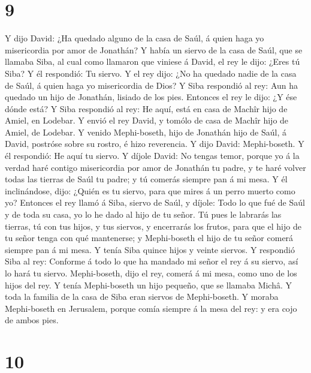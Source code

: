 \hypertarget{section-8}{%
\section{9}\label{section-8}}

 Y dijo David: ¿Ha quedado alguno de la casa de Saúl, á
quien haga yo misericordia por amor de Jonathán?  Y había un
siervo de la casa de Saúl, que se llamaba Siba, al cual como llamaron
que viniese á David, el rey le dijo: ¿Eres tú Siba? Y él respondió: Tu
siervo.  Y el rey dijo: ¿No ha quedado nadie de la casa de
Saúl, á quien haga yo misericordia de Dios? Y Siba respondió al rey: Aun
ha quedado un hijo de Jonathán, lisiado de los pies. 
Entonces el rey le dijo: ¿Y ése dónde está? Y Siba respondió al rey: He
aquí, está en casa de Machîr hijo de Amiel, en Lodebar.  Y
envió el rey David, y tomólo de casa de Machîr hijo de Amiel, de
Lodebar.  Y venido Mephi-boseth, hijo de Jonathán hijo de
Saúl, á David, postróse sobre su rostro, é hizo reverencia. Y dijo
David: Mephi-boseth. Y él respondió: He aquí tu siervo.  Y
díjole David: No tengas temor, porque yo á la verdad haré contigo
misericordia por amor de Jonathán tu padre, y te haré volver todas las
tierras de Saúl tu padre; y tú comerás siempre pan á mi mesa.
 Y él inclinándose, dijo: ¿Quién es tu siervo, para que
mires á un perro muerto como yo?  Entonces el rey llamó á
Siba, siervo de Saúl, y díjole: Todo lo que fué de Saúl y de toda su
casa, yo lo he dado al hijo de tu señor.  Tú pues le
labrarás las tierras, tú con tus hijos, y tus siervos, y encerrarás los
frutos, para que el hijo de tu señor tenga con qué mantenerse; y
Mephi-boseth el hijo de tu señor comerá siempre pan á mi mesa. Y tenía
Siba quince hijos y veinte siervos.  Y respondió Siba al
rey: Conforme á todo lo que ha mandado mi señor el rey á su siervo, así
lo hará tu siervo. Mephi-boseth, dijo el rey, comerá á mi mesa, como uno
de los hijos del rey.  Y tenía Mephi-boseth un hijo
pequeño, que se llamaba Michâ. Y toda la familia de la casa de Siba eran
siervos de Mephi-boseth.  Y moraba Mephi-boseth en
Jerusalem, porque comía siempre á la mesa del rey: y era cojo de ambos
pies.

\hypertarget{section-9}{%
\section{10}\label{section-9}}

